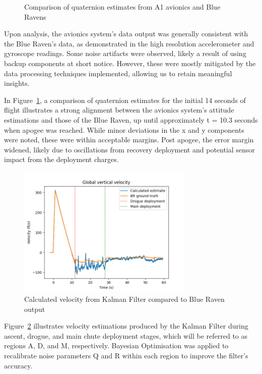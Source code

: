 \begin{figure}[h]
\begin{center}
\begin{minipage}{0.48\textwidth}
        \end{minipage}
    \end{center}
    \caption{Comparison of quaternion estimates from A1 avionics and Blue Ravens}\label{fig:quaternion_A1}
\end{figure}

Upon analysis, the avionics system’s data output was generally consistent with the Blue Raven's data, as demonstrated in the high resolution accelerometer and gyroscope readings. Some noise artifacts were observed, likely a result of using backup components at short notice. However, these were mostly mitigated by the data processing techniques implemented, allowing us to retain meaningful insights.

In Figure~\ref{fig:quaternion_A1}, a comparison of quaternion estimates for the initial 14 seconds of flight illustrates a strong alignment between the avionics system’s attitude estimations and those of the Blue Raven, up until approximately t = 10.3 seconds when apogee was reached. While minor deviations in the x and y components were noted, these were within acceptable margins. Post apogee, the error margin widened, likely due to oscillations from recovery deployment and potential sensor impact from the deployment charges. 

\begin{figure}[h]
    \begin{center}
        \includegraphics[width=0.75\textwidth]{./img/velocity_A1.png}
    \end{center}
    \caption{Calculated velocity from Kalman Filter compared to Blue Raven output}\label{fig:velocity_A1}
\end{figure}

Figure~\ref{fig:velocity_A1} illustrates velocity estimations produced by the Kalman Filter during ascent, drogue, and main chute deployment stages, which will be referred to as regions A, D, and M, respectively. Bayesian Optimisation was applied to recalibrate noise parameters Q and R within each region to improve the filter’s accuracy. 

